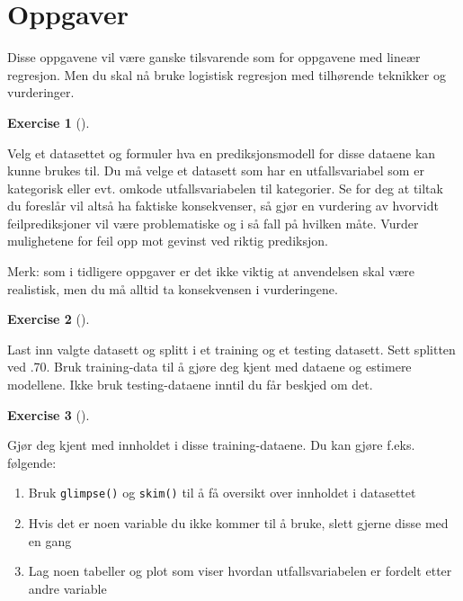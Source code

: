 \documentclass[
  letterpaper,
  DIV=11,
  numbers=noendperiod]{scrreprt}
\providecommand{\tightlist}{%
  \setlength{\itemsep}{0pt}\setlength{\parskip}{0pt}}\usepackage{longtable,booktabs,array}
\theoremstyle{definition}
\newtheorem{exercise}{Exercise}[chapter]
\theoremstyle{remark}
\begin{document}
\hypertarget{oppgaver-2}{%
\section{Oppgaver}\label{oppgaver-2}}

Disse oppgavene vil være ganske tilsvarende som for oppgavene med lineær
regresjon. Men du skal nå bruke logistisk regresjon med tilhørende
teknikker og vurderinger.

\leavevmode{}%
\begin{exercise}[]\label{exr-ols-eksplisitt}

Velg et datasettet og formuler hva en prediksjonsmodell for disse
dataene kan kunne brukes til. Du må velge et datasett som har en
utfallsvariabel som er kategorisk eller evt. omkode utfallsvariabelen
til kategorier. Se for deg at tiltak du foreslår vil altså ha faktiske
konsekvenser, så gjør en vurdering av hvorvidt feilprediksjoner vil være
problematiske og i så fall på hvilken måte. Vurder mulighetene for feil
opp mot gevinst ved riktig prediksjon.

Merk: som i tidligere oppgaver er det ikke viktig at anvendelsen skal
være realistisk, men du må alltid ta konsekvensen i vurderingene.

\end{exercise}

\leavevmode{}%
\begin{exercise}[]\label{exr-logit-split}

Last inn valgte datasett og splitt i et training og et testing datasett.
Sett splitten ved .70. Bruk training-data til å gjøre deg kjent med
dataene og estimere modellene. Ikke bruk testing-dataene inntil du får
beskjed om det.

\end{exercise}

\leavevmode{}%
\begin{exercise}[]\label{exr-logit-sepaa}

Gjør deg kjent med innholdet i disse training-dataene. Du kan gjøre
f.eks. følgende:

\begin{enumerate}
\def\labelenumi{\alph{enumi})}
\tightlist
\item
  Bruk \texttt{glimpse()} og \texttt{skim()} til å få oversikt over
  innholdet i datasettet
\item
  Hvis det er noen variable du ikke kommer til å bruke, slett gjerne
  disse med en gang
\item
  Lag noen tabeller og plot som viser hvordan utfallsvariabelen er
  fordelt etter andre variable
\end{enumerate}

\end{exercise}
\end{document}
